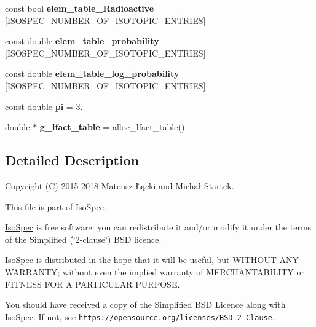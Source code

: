 \begin{DoxyCompactItemize}
const bool {\bfseries elem\+\_\+table\+\_\+\+Radioactive} \mbox{[}I\+S\+O\+S\+P\+E\+C\+\_\+\+N\+U\+M\+B\+E\+R\+\_\+\+O\+F\+\_\+\+I\+S\+O\+T\+O\+P\+I\+C\+\_\+\+E\+N\+T\+R\+I\+ES\mbox{]}
\item 
\mbox{\label{namespace_iso_spec_a0f9c2f5f409e63672066a692931e189b}} 
const double {\bfseries elem\+\_\+table\+\_\+probability} \mbox{[}I\+S\+O\+S\+P\+E\+C\+\_\+\+N\+U\+M\+B\+E\+R\+\_\+\+O\+F\+\_\+\+I\+S\+O\+T\+O\+P\+I\+C\+\_\+\+E\+N\+T\+R\+I\+ES\mbox{]}
\item 
\mbox{\label{namespace_iso_spec_a9fe61f2f9c36103283bb256a2f59e93a}} 
const double {\bfseries elem\+\_\+table\+\_\+log\+\_\+probability} \mbox{[}I\+S\+O\+S\+P\+E\+C\+\_\+\+N\+U\+M\+B\+E\+R\+\_\+\+O\+F\+\_\+\+I\+S\+O\+T\+O\+P\+I\+C\+\_\+\+E\+N\+T\+R\+I\+ES\mbox{]}
\item 
\mbox{\label{namespace_iso_spec_acc706853ec222cb50405ee264e9007bf}} 
const double {\bfseries pi} = 3.
\item 
\mbox{\label{namespace_iso_spec_a8be6485cb575264c4ec7398501f7c99d}} 
double $\ast$ {\bfseries g\+\_\+lfact\+\_\+table} = alloc\+\_\+lfact\+\_\+table()
\end{DoxyCompactItemize}


\subsection{Detailed Description}
Copyright (C) 2015-\/2018 Mateusz Łącki and Michał Startek.

This file is part of \mbox{\hyperlink{namespace_iso_spec}{Iso\+Spec}}.

\mbox{\hyperlink{namespace_iso_spec}{Iso\+Spec}} is free software\+: you can redistribute it and/or modify it under the terms of the Simplified (\char`\"{}2-\/clause\char`\"{}) B\+SD licence.

\mbox{\hyperlink{namespace_iso_spec}{Iso\+Spec}} is distributed in the hope that it will be useful, but W\+I\+T\+H\+O\+UT A\+NY W\+A\+R\+R\+A\+N\+TY; without even the implied warranty of M\+E\+R\+C\+H\+A\+N\+T\+A\+B\+I\+L\+I\+TY or F\+I\+T\+N\+E\+SS F\+OR A P\+A\+R\+T\+I\+C\+U\+L\+AR P\+U\+R\+P\+O\+SE.

You should have received a copy of the Simplified B\+SD Licence along with \mbox{\hyperlink{namespace_iso_spec}{Iso\+Spec}}. If not, see \href{https://opensource.org/licenses/BSD-2-Clause}{\tt https\+://opensource.\+org/licenses/\+B\+S\+D-\/2-\/\+Clause}. 

